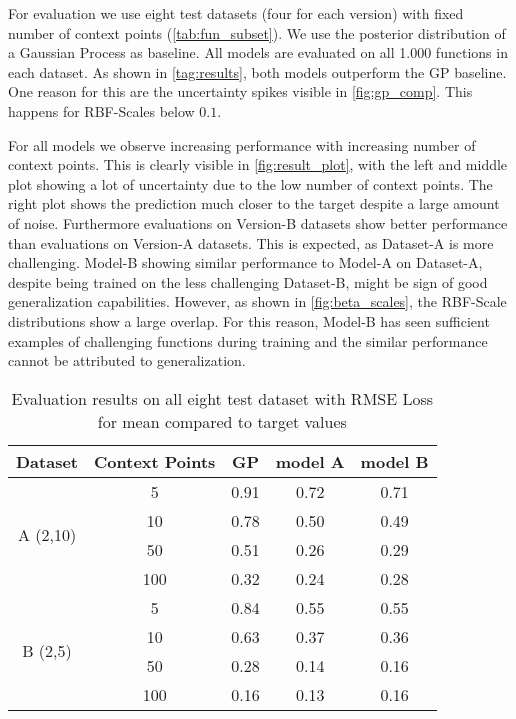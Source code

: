For evaluation we use eight test datasets (four for each version) with fixed number of context points (\autoref{tab:fun_subset}). We use the posterior distribution of a Gaussian Process as baseline. All models are evaluated on all 1.000 functions in each dataset.
As shown in \autoref{tag:results}, both models outperform the GP baseline. One reason for this are the uncertainty spikes visible in \autoref{fig:gp_comp}. This happens for RBF-Scales below $0.1$.

For all models we observe increasing performance with increasing number of context points. This is clearly visible in \autoref{fig:result_plot}, with the left and middle plot showing a lot of uncertainty due to the low number of context points. The right plot shows the prediction much closer to the target despite a large amount of noise. Furthermore evaluations on Version-B datasets show better performance than evaluations on Version-A datasets. This is expected, as Dataset-A is more challenging. Model-B showing similar performance to Model-A on Dataset-A, despite being trained on the less challenging Dataset-B, might be sign of good generalization capabilities. However, as shown in \autoref{fig:beta_scales}, the RBF-Scale distributions show a large overlap. For this reason, Model-B has seen sufficient examples of challenging functions during training and the similar performance cannot be attributed to generalization.

	\begin{table}[]
	\caption{Evaluation results on all eight test dataset with RMSE Loss for mean compared to target values}
	\begin{tabular}{c c c c c}
		\toprule
		Dataset & Context Points & GP & model A & model B\\
		\midrule
		\multirow{4}{*}{A (2,10)} & 5 & 0.91 & 0.72 & 0.71\\
		&10& 0.78 & 0.50 & 0.49\\ 
		&50 & 0.51 & 0.26 & 0.29\\
		&100 & 0.32 & 0.24 & 0.28\\\midrule
		\multirow{4}{*}{B (2,5)} & 5 & 0.84 & 0.55 & 0.55\\
		& 10 & 0.63 & 0.37 & 0.36\\
		& 50 & 0.28 & 0.14 & 0.16\\
		& 100 & 0.16 & 0.13 & 0.16\\\bottomrule
	\end{tabular}
\label{tag:results}
\end{table}

